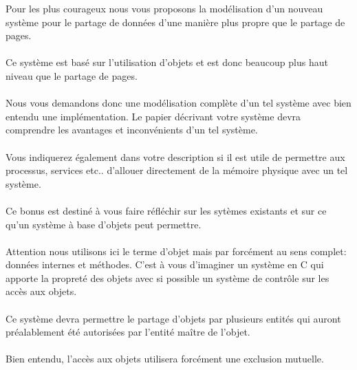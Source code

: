 \documentclass[10pt,a4wide]{article}
\begin{document}
Pour les plus courageux nous vous proposons la mod\'elisation d'un nouveau
syst\`eme pour le partage de donn\'ees d'une mani\`ere plus propre que
le partage de pages.

\paragraph{}

Ce syst\`eme est bas\'e sur l'utilisation d'objets et est donc beaucoup
plus haut niveau que le partage de pages.

\paragraph{}

Nous vous demandons donc une mod\'elisation compl\`ete d'un tel syst\`eme
avec bien entendu une impl\'ementation. Le papier d\'ecrivant votre
syst\`eme devra comprendre les avantages et inconv\'enients d'un tel
syst\`eme.

\paragraph{}

Vous indiquerez \'egalement dans votre description si il est utile de
permettre aux processus, services etc.. d'allouer directement de la
m\'emoire physique avec un tel syst\`eme.

\paragraph{}

Ce bonus est destin\'e \`a vous faire r\'efl\'echir sur les syt\`emes
existants et sur ce qu'un syst\`eme \`a base d'objets peut permettre.

\paragraph{}

Attention nous utilisons ici le terme d'objet mais par forc\'ement au sens
complet: donn\'ees internes et m\'ethodes. C'est \`a vous d'imaginer un
syst\`eme en C qui apporte la propret\'e des objets avec si possible
un syst\`eme de contr\^ole sur les acc\`es aux objets.

\paragraph{}

Ce syst\`eme devra permettre le partage d'objets par plusieurs entit\'es
qui auront pr\'ealablement \'et\'e autoris\'ees par l'entit\'e ma\^itre de
l'objet.

\paragraph{}

Bien entendu, l'acc\`es aux objets utilisera forc\'ement une
exclusion mutuelle.
\end{document}
